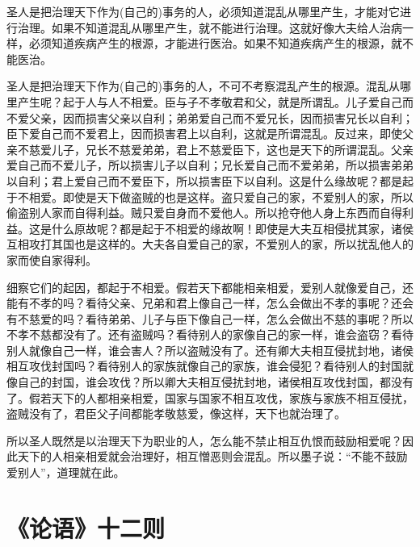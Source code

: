 \documentclass[12pt,UTF-8,openany]{ctexbook}
\begin{document}
\begin{normalsize}
    
    圣人是把治理天下作为(自己的)事务的人，必须知道混乱从哪里产生，才能对它进行治理。如果不知道混乱从哪里产生，就不能进行治理。这就好像大夫给人治病一样，必须知道疾病产生的根源，才能进行医治。如果不知道疾病产生的根源，就不能医治。
    
    圣人是把治理天下作为(自己的)事务的人，不可不考察混乱产生的根源。混乱从哪里产生呢？起于人与人不相爱。臣与子不孝敬君和父，就是所谓乱。儿子爱自己而不爱父亲，因而损害父亲以自利；弟弟爱自己而不爱兄长，因而损害兄长以自利；臣下爱自己而不爱君上，因而损害君上以自利，这就是所谓混乱。反过来，即使父亲不慈爱儿子，兄长不慈爱弟弟，君上不慈爱臣下，这也是天下的所谓混乱。父亲爱自己而不爱儿子，所以损害儿子以自利；兄长爱自己而不爱弟弟，所以损害弟弟以自利；君上爱自己而不爱臣下，所以损害臣下以自利。这是什么缘故呢？都是起于不相爱。即使是天下做盗贼的也是这样。盗只爱自己的家，不爱别人的家，所以偷盗别人家而自得利益。贼只爱自身而不爱他人。所以抢夺他人身上东西而自得利益。这是什么原故呢？都是起于不相爱的缘故啊！即使是大夫互相侵扰其家，诸侯互相攻打其国也是这样的。大夫各自爱自己的家，不爱别人的家，所以扰乱他人的家而使自家得利。
    
    细察它们的起因，都起于不相爱。假若天下都能相亲相爱，爱别人就像爱自己，还能有不孝的吗？看待父亲、兄弟和君上像自己一样，怎么会做出不孝的事呢？还会有不慈爱的吗？看待弟弟、儿子与臣下像自己一样，怎么会做出不慈的事呢？所以不孝不慈都没有了。还有盗贼吗？看待别人的家像自己的家一样，谁会盗窃？看待别人就像自己一样，谁会害人？所以盗贼没有了。还有卿大夫相互侵扰封地，诸侯相互攻伐封国吗？看待别人的家族就像自己的家族，谁会侵犯？看待别人的封国就像自己的封国，谁会攻伐？所以卿大夫相互侵扰封地，诸侯相互攻伐封国，都没有了。假若天下的人都相亲相爱，国家与国家不相互攻伐，家族与家族不相互侵扰，盗贼没有了，君臣父子间都能孝敬慈爱，像这样，天下也就治理了。
    
    所以圣人既然是以治理天下为职业的人，怎么能不禁止相互仇恨而鼓励相爱呢？因此天下的人相亲相爱就会治理好，相互憎恶则会混乱。所以墨子说：“不能不鼓励爱别人”，道理就在此。
    
\end{normalsize}



\chapter{《论语》十二则}
\end{document}
